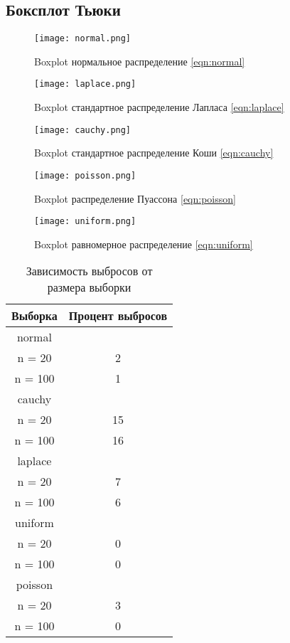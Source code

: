 \documentclass[a4]{article}
\begin{document}
\subsection{Боксплот Тьюки}
\begin{center}

\begin{figure}[H]
\caption{Boxplot нормальное распределение \eqref{eqn:normal}}
\texttt{[image: normal.png]}
\end{figure}

\begin{figure}[H]
\caption{Boxplot стандартное распределение Лапласа \eqref{eqn:laplace}}
\texttt{[image: laplace.png]} 
\end{figure}

\begin{figure}[H]
\caption{Boxplot стандартное распределение Коши \eqref{eqn:cauchy}}
\texttt{[image: cauchy.png]} 
\end{figure}

\begin{figure}[H]
\caption{Boxplot распределение Пуассона \eqref{eqn:poisson}}
\texttt{[image: poisson.png]} 
\end{figure}

\begin{figure}[H]
 \caption{Boxplot равномерное распределение \eqref{eqn:uniform}}
\texttt{[image: uniform.png]}
\end{figure}

\begin{table}[H]
    
    \caption{Зависимость выбросов от размера выборки}
    \label{tab:my_label}
    \begin{center}
    \vspace{5mm}
    \begin{tabular}{|c|c|}
    \hline
    Выборка & Процент выбросов\\
    \hline
         normal	&\\
         \hline
n = 20   & 	2    \\
\hline
n = 100   &	1    \\
	\hline
cauchy	&\\
\hline
n = 20   & 	15    \\
\hline
n = 100  & 	16    \\
	\hline
laplace	&\\
\hline
n = 20    &	7    \\
\hline
n = 100   &	6    \\
	\hline
uniform	&\\
\hline
n = 20    &	0    \\
\hline
n = 100   &	0   \\ 
	\hline
poisson	&\\
\hline
n = 20   & 	3    \\
\hline
n = 100  & 	0    \\
\hline
    \end{tabular}
    

\end{center}
\end{table}
\end{center}
\end{document}

